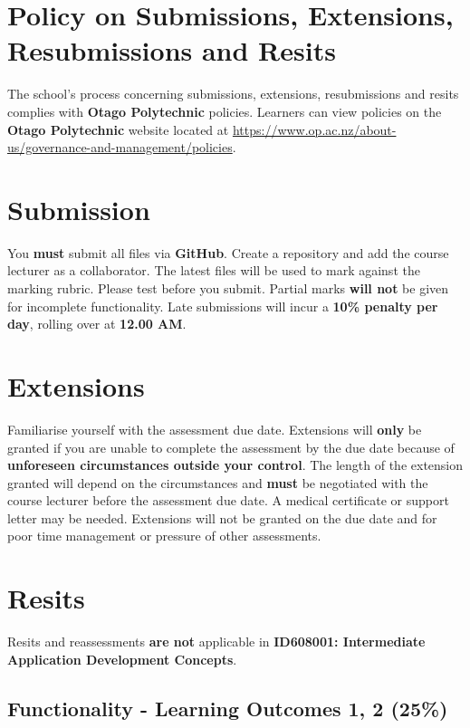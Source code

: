 \documentclass{article}
\begin{document}
	\section*{Policy on Submissions, Extensions, Resubmissions and Resits}
	The school's process concerning submissions, extensions, resubmissions and
	resits complies with \textbf{Otago Polytechnic} policies. Learners can view
	policies on the \textbf{Otago Polytechnic} website located at \href{https://www.op.ac.nz/about-us/governance-and-management/policies}{https://www.op.ac.nz/about-us/governance-and-management/policies}.

	\section*{Submission}
	You \textbf{must} submit all files via \textbf{GitHub}. Create a
	repository and add the course lecturer as a collaborator. The latest files will be used to mark against the marking rubric. Please test before you submit. Partial marks \textbf{will not} be given for incomplete functionality. Late submissions will incur a \textbf{10\% penalty per day}, rolling over at \textbf{12.00 AM}.

	\section*{Extensions}
	Familiarise yourself with the assessment due date. Extensions will \textbf{only}
	be granted if you are unable to complete the assessment by the due date
	because of \textbf{unforeseen circumstances outside your control}. The length
	of the extension granted will depend on the circumstances and \textbf{must} be
	negotiated with the course lecturer before the assessment due date. A medical
	certificate or support letter may be needed. Extensions will not be granted on
	the due date and for poor time management or pressure of other assessments.

	\section*{Resits}
	Resits and reassessments \textbf{are not} applicable in \textbf{ID608001: Intermediate
	Application Development Concepts}.

	\subsection*{Functionality - Learning Outcomes 1, 2 (25\%)}
\end{document}
